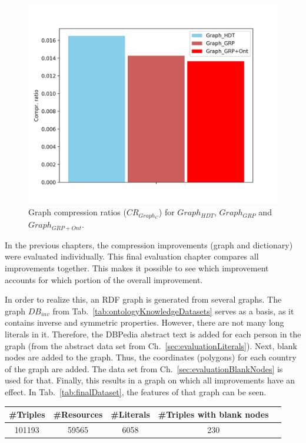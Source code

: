 \begin{figure}
	\centering
	\includegraphics[width=0.6\linewidth]{figures/4_evaluation/final/graphcompr}
	\caption{Graph compression ratios ($CR_{Graph_C}$) for $Graph_{HDT}$, $Graph_{GRP}$ and $Graph_{GRP+Ont}$.}
	\label{fig:graphcompr}
\end{figure}


In the previous chapters, the compression improvements (graph and dictionary) were evaluated individually. This final evaluation chapter compares all improvements together. This makes it possible to see which improvement accounts for which portion of the overall improvement. 

In order to realize this, an RDF graph is generated from several graphs. The graph $DB_{inv}$ from Tab.~\ref{tab:ontologyKnowledgeDatasets} serves as a basis, as it contains inverse and symmetric properties. However, there are not many long literals in it. Therefore, the DBPedia abstract text is added for each person in the graph (from the abstract data set from Ch.~\ref{sec:evaluationLiterals}). Next, blank nodes are added to the graph. Thus, the coordinates (polygons) for each country of the graph are added. The data set from Ch.~\ref{sec:evaluationBlankNodes} is used for that. Finally, this results in a graph on which all improvements have an effect. In Tab.~\ref{tab:finalDataset}, the features of that graph can be seen.

\begin{center}
	\begin{tabular}{|c|c|c|c|c|}
		\hline 
		 \#Triples & \#Resources & \#Literals & \#Triples with blank nodes \\ 
		\hline
		101193 &59565 & 6058 & 230 \\
		\hline 
	\end{tabular} 
	\label{tab:finalDataset}
\end{center}

